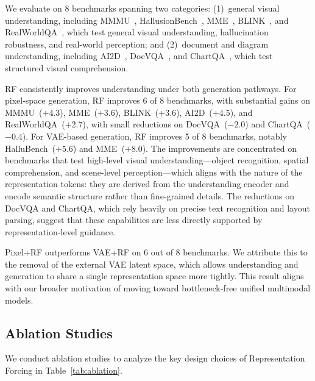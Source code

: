 \documentclass{llmxive}
\begin{document}
We evaluate on 8 benchmarks spanning two categories: (1)~general visual understanding, including MMMU~\cite{mmmu}, HallusionBench~\cite{hallubench}, MME~\cite{mme}, BLINK~\cite{blink}, and RealWorldQA~\cite{rwqa}, which test general visual understanding, hallucination robustness, and real-world perception; and (2)~document and diagram understanding, including AI2D~\cite{ai2d}, DocVQA~\cite{docvqa}, and ChartQA~\cite{chartqa}, which test structured visual comprehension.

RF consistently improves understanding under both generation pathways. For pixel-space generation, RF improves 6 of 8 benchmarks, with substantial gains on MMMU~($+4.3$), MME~($+3.6$), BLINK~($+3.6$), AI2D~($+4.5$), and RealWorldQA~($+2.7$), with small reductions on DocVQA~($-2.0$) and ChartQA~($-0.4$). For VAE-based generation, RF improves 5 of 8 benchmarks, notably HalluBench~($+5.6$) and MME~($+8.0$). The improvements are concentrated on benchmarks that test high-level visual understanding---object recognition, spatial comprehension, and scene-level perception---which aligns with the nature of the representation tokens: they are derived from the understanding encoder and encode semantic structure rather than fine-grained details. The reductions on DocVQA and ChartQA, which rely heavily on precise text recognition and layout parsing, suggest that these capabilities are less directly supported by representation-level guidance.

Pixel+RF outperforms VAE+RF on 6 out of 8 benchmarks. We attribute this to the removal of the external VAE latent space, which allows understanding and generation to share a single representation space more tightly. This result aligns with our broader motivation of moving toward bottleneck-free unified multimodal models.



\subsection{Ablation Studies}
\label{sec:ablation}

We conduct ablation studies to analyze the key design choices of Representation Forcing in Table~\ref{tab:ablation}.
\end{document}
